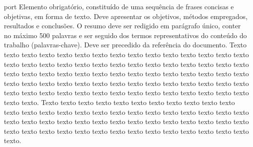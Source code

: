
\begin{resumo}{port}
Elemento obrigatório, constituído de uma sequência de frases concisas e
objetivas, em forma de texto.  Deve apresentar os objetivos, métodos empregados,
resultados e conclusões.  O resumo deve ser redigido em parágrafo único, conter
no máximo 500 palavras e ser seguido dos termos representativos do conteúdo do
trabalho (palavras-chave). Deve ser precedido da referência do documento.
Texto texto texto texto texto texto texto texto texto texto texto texto texto
texto texto texto texto texto texto texto texto texto texto texto texto texto
texto texto texto texto texto texto texto texto texto texto texto texto texto
texto texto texto texto texto texto texto texto texto texto texto texto texto
texto texto texto texto texto texto texto texto texto texto texto texto texto
texto texto texto texto texto texto texto texto.
Texto texto texto texto texto texto texto texto texto texto texto texto texto
texto texto texto texto texto texto texto texto texto texto texto texto texto
texto texto texto texto texto texto texto texto texto texto texto texto texto
texto texto texto texto texto texto texto texto texto texto texto texto texto
texto texto.
\end{resumo}

